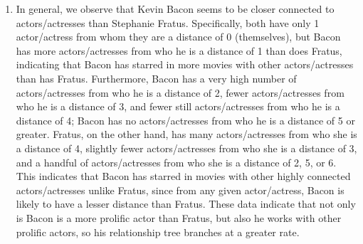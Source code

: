 \documentclass{article}
\begin{document}
\begin{enumerate}
    \item In general, we observe that Kevin Bacon seems to be closer connected to actors/actresses than Stephanie Fratus. Specifically, both have only 1 actor/actress from whom they are a distance of 0 (themselves), but Bacon has more actors/actresses from who he is a distance of 1 than does Fratus, indicating that Bacon has starred in more movies with other actors/actresses than has Fratus. Furthermore, Bacon has a very high number of actors/actresses from who he is a distance of 2, fewer actors/actresses from who he is a distance of 3, and fewer still actors/actresses from who he is a distance of 4; Bacon has no actors/actresses from who he is a distance of 5 or greater. Fratus, on the other hand, has many actors/actresses from who she is a distance of 4, slightly fewer actors/actresses from who she is a distance of 3, and a handful of actors/actresses from who she is a distance of 2, 5, or 6. This indicates that Bacon has starred in movies with other highly connected actors/actresses unlike Fratus, since from any given actor/actress, Bacon is likely to have a lesser distance than Fratus. These data indicate that not only is Bacon is a more prolific actor than Fratus, but also he works with other prolific actors, so his relationship tree branches at a greater rate. 
\end{enumerate}
\end{document}
